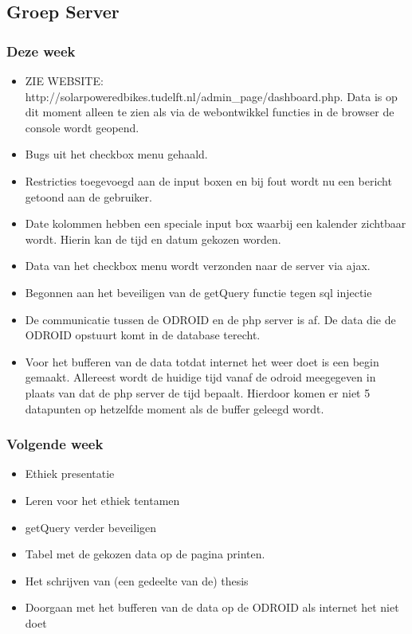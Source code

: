 \subsection*{Groep Server}
\subsubsection*{Deze week}
\begin{itemize}
\item
ZIE WEBSITE: http://solarpoweredbikes.tudelft.nl/admin\_page/dashboard.php.
Data is op dit moment alleen te zien als via de webontwikkel functies in de browser de console wordt geopend.
\item
Bugs uit het checkbox menu gehaald.
\item
Restricties toegevoegd aan de input boxen en bij fout wordt nu een bericht getoond aan de gebruiker.
\item
Date kolommen hebben een speciale input box waarbij een kalender zichtbaar wordt. Hierin kan de tijd en datum gekozen worden.
\item
Data van het checkbox menu wordt verzonden naar de server via ajax.
\item
Begonnen aan het beveiligen van de getQuery functie tegen sql injectie
\item
De communicatie tussen de ODROID en de php server is af. De data die de ODROID opstuurt komt in de database terecht.
\item
Voor het bufferen van de data totdat internet het weer doet is een begin gemaakt. Allereest wordt de huidige tijd vanaf de odroid meegegeven in plaats van dat de php server de tijd bepaalt.
Hierdoor komen er niet 5 datapunten op hetzelfde moment als de buffer geleegd wordt.
\end{itemize}
\subsubsection*{Volgende week}
\begin{itemize}
\item
Ethiek presentatie
\item
Leren voor het ethiek tentamen
\item
getQuery verder beveiligen
\item
Tabel met de gekozen data op de pagina printen.
\item
Het schrijven van (een gedeelte van de) thesis
\item
Doorgaan met het bufferen van de data op de ODROID als internet het niet doet
\end{itemize}
